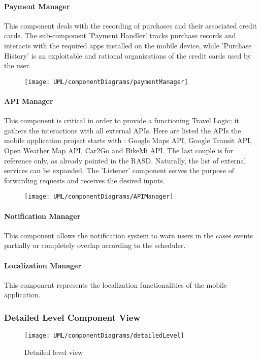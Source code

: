 	\paragraph{Payment Manager}
		This component deals with the recording of purchases and their associated credit cards.
		The sub-component 'Payment Handler' tracks purchase records and interacts with the required apps installed on the mobile device, while 'Purchase History' is an exploitable and rational organizations of the credit cards used by the user.

		\begin{figure}[H]
			\centering
			\texttt{[image: UML/componentDiagrams/paymentManager]}
		\end{figure}
	

	\paragraph{API Manager} 
		This component is critical in order to provide a functioning Travel Logic: it gathers the interactions with all external APIs.
		Here are listed the APIs the mobile application project starts with : Google Maps API, Google Transit API, Open Weather Map API, Car2Go and BikeMi API.
		The last couple is for reference only, as already pointed in the RASD. Naturally, the list of external services can be expanded.
		The 'Listener' component serves the purpose of forwarding requests and receives the desired inputs.
	
		\begin{figure}[H]
			\centering
			\texttt{[image: UML/componentDiagrams/APIManager]}
		\end{figure}
	
	
	\paragraph{Notification Manager}
		This component allows the notification system to warn users in the cases events partially or completely overlap according to the scheduler.

	\paragraph{Localization Manager}
		This component represents the localization functionalities of the mobile application.


\subsubsection{Detailed Level Component View}

	\begin{landscape}
		\begin{figure}
			\centering
			\texttt{[image: UML/componentDiagrams/detailedLevel]}
			\caption{Detailed level view}
			\label{detailedHighLevel}
		\end{figure}
	\end{landscape}